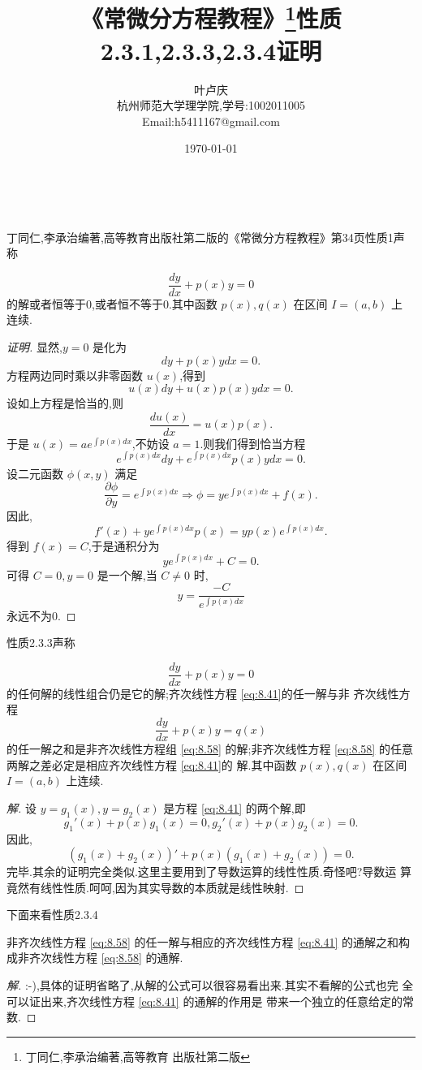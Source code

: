 \documentclass[a4paper, 12pt]{article} %
\title{\textbf{《常微分方程教程》\footnote{丁同仁,李承治编著,高等教育
      出版社第二版}性质2.3.1,2.3.3,2.3.4证明}}
\author{\small{叶卢庆}\\{\small{杭州师范大学理学院,学号:1002011005}}\\{\small{Email:h5411167@gmail.com}}} %
\date{\today} %
\makeatletter
\renewcommand{\maketitle}{ %
  \renewcommand\refname{参考文献}
  \newcommand{\D}{\displaystyle}\newcommand{\ri}{\Rightarrow}
  \newcommand{\ds}{\displaystyle} \renewcommand{\ni}{\noindent}
  \newcommand{\pa}{\partial} \newcommand{\Om}{\Omega}
  \newcommand{\om}{\omega} \newcommand{\sik}{\sum_{i=1}^k}
  \newcommand{\vov}{\Vert\omega\Vert} \newcommand{\Umy}{U_{\mu_i,y^i}}
  \newcommand{\lamns}{\lambda_n^{^{\scriptstyle\sigma}}}
  \newcommand{\chiomn}{\chi_{_{\Omega_n}}}
  \newcommand{\ullim}{\underline{\lim}} \newcommand{\bsy}{\boldsymbol}
  \newcommand{\mvb}{\mathversion{bold}} \newcommand{\la}{\lambda}
  \newcommand{\La}{\Lambda} \newcommand{\va}{\varepsilon}
  \newcommand{\be}{\beta} \newcommand{\al}{\alpha}
  \newcommand{\dis}{\displaystyle} \newcommand{\R}{{\mathbb R}}
  \newcommand{\N}{{\mathbb N}} \newcommand{\cF}{{\mathcal F}}
  \newcommand{\gB}{{\mathfrak B}} \newcommand{\eps}{\epsilon}
  \begin{flushright} %
    {\LARGE\@title} %
    
    \vspace{50pt} %
    
    {\large\@author} %
    \\\@date %
    
    \vspace{40pt} %
  \end{flushright}
}
\makeatother
\begin{document}
\maketitle
丁同仁,李承治编著,高等教育出版社第二版的《常微分方程教程》第34页性质1声
称\begin{shaded}
$$
\frac{dy}{dx}+p(x)y=0
$$
的解或者恒等于0,或者恒不等于0.其中函数 $p(x),q(x)$ 在区间 $I=(a,b)$ 上
连续.
\end{shaded}
\begin{proof}[证明]
显然,$y=0$ 是化为
$$
dy+p(x)ydx=0.
$$
方程两边同时乘以非零函数 $u(x)$,得到
$$
u(x)dy+u(x)p(x)ydx=0.
$$
设如上方程是恰当的,则
$$
\frac{du(x)}{dx}=u(x)p(x).
$$
于是 $u(x)=ae^{\int p(x)dx}$,不妨设 $a=1$.则我们得到恰当方程
$$
e^{\int p(x)dx}dy+e^{\int p(x)dx}p(x)ydx=0.
$$
设二元函数 $\phi(x,y)$ 满足
$$
\frac{\pa \phi}{\pa y}=e^{\int p(x)dx}\ri \phi=ye^{\int p(x)dx}+f(x).
$$
因此,
$$
f'(x)+ye^{\int p(x)dx}p(x)=yp(x)e^{\int p(x)dx}.
$$
得到 $f(x)=C$,于是通积分为
$$
ye^{\int p(x)dx}+C=0.
$$
可得 $C=0,y=0$ 是一个解,当 $C\neq 0$ 时,
$$
y=\frac{-C}{e^{\int p(x)dx}}
$$
永远不为0.
\end{proof}\bigskip\bigskip
性质2.3.3声称
\begin{shaded}
\begin{equation}\label{eq:8.41}
\frac{dy}{dx}+p(x)y=0
\end{equation}
的任何解的线性组合仍是它的解;齐次线性方程 \eqref{eq:8.41}的任一解与非
齐次线性方程
\begin{equation}
  \label{eq:8.58}
  \frac{dy}{dx}+p(x)y=q(x)
\end{equation}
的任一解之和是非齐次线性方程组 \eqref{eq:8.58} 的解;非齐次线性方程
\eqref{eq:8.58} 的任意两解之差必定是相应齐次线性方程 \eqref{eq:8.41}的
解.其中函数 $p(x),q(x)$ 在区间 $I=(a,b)$ 上连续.
\end{shaded}
\begin{proof}[解]
设 $y=g_1(x),y=g_2(x)$ 是方程 \eqref{eq:8.41} 的两个解,即
$$
g_1'(x)+p(x)g_1(x)=0,g_2'(x)+p(x)g_2(x)=0.
$$
因此,
$$
(g_1(x)+g_2(x))'+p(x)(g_1(x)+g_2(x))=0.
$$
完毕.其余的证明完全类似.这里主要用到了导数运算的线性性质.奇怪吧?导数运
算竟然有线性性质.呵呵,因为其实导数的本质就是线性映射.
\end{proof}
下面来看性质2.3.4
\begin{shaded}
\ni 非齐次线性方程 \eqref{eq:8.58} 的任一解与相应的齐次线性方程 \eqref{eq:8.41}
 的通解之和构成非齐次线性方程 \eqref{eq:8.58} 的通解.
\end{shaded}
\begin{proof}[解]
  :-),具体的证明省略了,从解的公式可以很容易看出来.其实不看解的公式也完
  全可以证出来,齐次线性方程 \eqref{eq:8.41} 的通解的作用是
  带来一个独立的任意给定的常数.
\end{proof}

 

\end{document}
